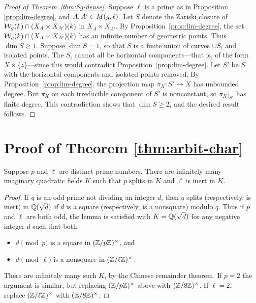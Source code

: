 \documentclass{amsart}
\begin{document}
\begin{proof}[Proof of Theorem~\ref{thm:Sg-dense}]
Suppose $\ell$ is a prime as in Proposition \ref{prop:lim-degree}, and $A,A'\in M(g,\ell)$.
  Let $S$ denote the Zariski closure of $\mathcal{W}_g(k) \cap (X_A \times X_{A'})(k)$ in $X_A \times X_{A'}$. By Proposition~\ref{prop:lim-degree}, the set $\mathcal{W}_g(k) \cap (X_A \times X_{A'})(k)$ has an infinite number of geometric points. Thus $\dim S \geq 1$. Suppose $\dim S = 1$, so that $S$ is a finite union of curves $\cup S_i$ and isolated points. The $S_i$ cannot all be horizontal components---that is, of the form $X \times \{z\}$---since this would contradict Proposition~\ref{prop:lim-degree}. Let $S'$ be $S$ with the horizontal components and isolated points removed. By Proposition~\ref{prop:lim-degree}, the projection map $\pi_X: S' \to X$ has unbounded degree. But $\pi_X$ on each irreducible component of $S'$ is nonconstant, so $\pi_X|_{S'}$ has finite degree. This contradiction shows that $\dim S \geq 2$, and the desired result follows.
\end{proof}







\section{Proof of Theorem \ref{thm:arbit-char}}
\label{sec:characteristic-p}

\begin{lemma}\label{lemma:travis-lemma}
Suppose $p$ and $\ell$ are distinct prime numbers.  There are infinitely many
imaginary quadratic fields $K$ such that $p$ splits in $K$ and $\ell$ is inert in $K$.
\end{lemma}

\begin{proof}
If $q$ is an odd prime not dividing an integer $d$, then $q$ splits (respectively, is inert)
in $\mathbb{Q}(\sqrt{d})$ if $d$ is a square (respectively, is a nonsquare) modulo $q$.
Thus if $p$ and $\ell$ are both odd, the lemma is satisfied with $K = \mathbb{Q}(\sqrt{d})$
for any negative integer $d$ such that both:
\begin{itemize}
\item
$d \pmod{p}$ is a square in $(\mathbb{Z}/p\mathbb{Z})^\times$, and
\item
$d \pmod{\ell}$ is a nonsquare in $(\mathbb{Z}/\ell\mathbb{Z})^\times$.
\end{itemize}
There are infinitely many such $K$, by the Chinese remainder theorem.
If $p=2$ the argument is similar, but replacing $(\mathbb{Z}/p\mathbb{Z})^\times$ above with
$(\mathbb{Z}/8\mathbb{Z})^\times$.  If $\ell = 2$, replace
$(\mathbb{Z}/\ell\mathbb{Z})^\times$ with $(\mathbb{Z}/8\mathbb{Z})^\times$.
\end{proof}
\end{document}
